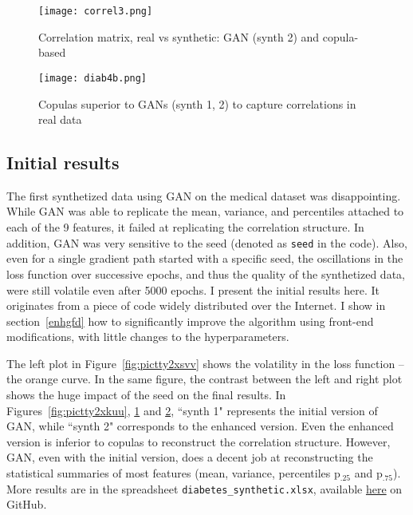 \documentclass[oneside,10pt]{book}
\begin{document}
\begin{figure}[H]
\centering
\texttt{[image: correl3.png]}
\caption{Correlation matrix, real vs synthetic: GAN (synth 2) and copula-based}
\label{fig:pictty2xsds}
\end{figure}

\begin{figure}[H]
\centering
\texttt{[image: diab4b.png]}
\caption{Copulas superior to GANs (synth 1, 2) to capture correlations in real data}
\label{fig:pictty2xs}
\end{figure}

\subsection{Initial results}

The first synthetized data using GAN on the medical dataset was disappointing. While GAN was able to replicate the mean, variance,
 and percentiles attached to each of the 9 features, it failed at replicating the correlation structure. In addition, GAN was very sensitive to the \textcolor{index}{seed} (denoted as \texttt{seed} in the code). Also, even for a single gradient path started with a specific seed,   the oscillations in the loss function over successive epochs, and thus the quality of the synthetized data, were still volatile even after 5000 epochs. I present the initial results here. It originates from a piece of code widely distributed over the Internet.
 I show in section~\ref{enhgfd} how to significantly improve the algorithm using front-end modifications, with little changes to the hyperparameters.

The left plot in Figure~\ref{fig:pictty2xsvv} shows the volatility in the loss function -- the orange curve. In the same figure, the contrast between the left and right plot shows the huge impact of the seed on the final results. In Figures~\ref{fig:pictty2xkuu},
 \ref{fig:pictty2xsds} and \ref{fig:pictty2xs}, ``synth 1" represents the initial version of GAN, while ``synth 2" corresponds to the enhanced version. Even the enhanced version is inferior to copulas to reconstruct the correlation structure. However, GAN, even with the initial version, does a decent job at reconstructing the statistical summaries of most features (mean, variance, percentiles p$_{.25}$ and p$_{.75}$).
 More results are in the spreadsheet \texttt{diabetes\_synthetic.xlsx}, available
 \href{https://github.com/VincentGranville/Main/blob/main/diabetes_synthetic.xlsx}{here} on GitHub.
\end{document}
